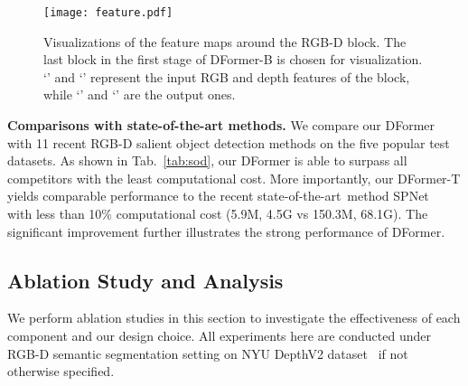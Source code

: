 \documentclass{article}
\newcommand{\tabref}[1]{Tab.~\ref{#1}}
\newcommand{\myPara}[1]{\vspace{5pt}\noindent\textbf{#1}}
\newcommand{\sArt}{state-of-the-art~}
\newcommand{\nMethod}{DFormer}
\begin{document}
\begin{figure}[tp]
\centering
\texttt{[image: feature.pdf]}
\vspace{-15pt}
\caption{\small Visualizations of the feature maps around the RGB-D block. The last block in the first stage of \nMethod{}-B is chosen for visualization.
`' and `' represent the input RGB and depth features of the block, while `' and `' are the output ones.
}\label{fig:visualization}
\vspace{-10pt}
\end{figure}


\myPara{Comparisons with state-of-the-art methods.}
We compare our \nMethod{} with 11 recent RGB-D salient object detection methods on the five popular test datasets.
As shown in \tabref{tab:sod}, our \nMethod{} is able to surpass all competitors with the least computational cost. 
More importantly, our \nMethod{}-T yields comparable performance to the recent \sArt method SPNet~\citep{zhou2021specificity} with less than 10\% computational cost (5.9M, 4.5G vs 150.3M, 68.1G).
The significant improvement further illustrates the strong performance of \nMethod{}.





















\subsection{Ablation Study and Analysis}\label{sec:ab}
We perform ablation studies in this section to investigate the effectiveness of each component and our design choice.
All experiments here are conducted under RGB-D semantic segmentation setting on NYU DepthV2 dataset~\citep{silberman2012nyu_dataset} if not otherwise specified.
\end{document}
